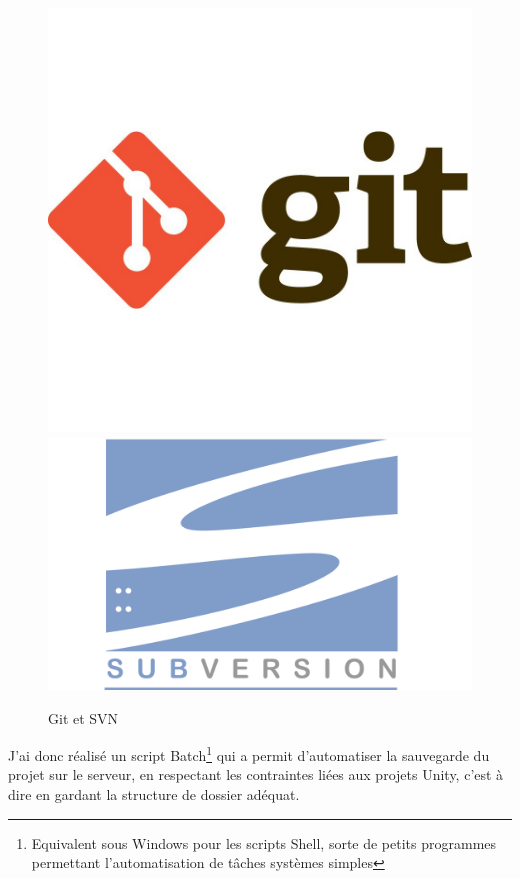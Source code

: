 \documentclass[a4paper]{article}
\begin{document}
    \begin{figure}[H]
        \centering
        \includegraphics[scale=0.5]{img/logo-git}
        \includegraphics[scale=0.15]{img/logo-svn}
        \caption{Git et SVN}
    \end{figure}

    J'ai donc réalisé un script Batch\footnote{Equivalent sous Windows pour les scripts Shell, sorte de petits programmes permettant l'automatisation de tâches systèmes simples} qui a permit d'automatiser la sauvegarde du projet sur le serveur, en respectant les contraintes liées aux projets Unity, c'est à dire en gardant la structure de dossier adéquat. \\
\end{document}
